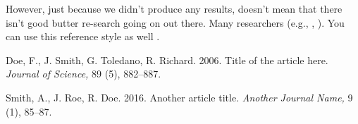 \documentclass[poms,final,nonblindrev]{poms1_V1} %
\begin{document}
However, just because we didn't produce any results, doesn't mean
that there isn't good butter re-search going on out there.  Many
researchers
(e.g., \citealt{Doe2014}, \citealt{Doe2009}). You can use this reference style as well \citep[e.g.][]{Doe2014,Doe2009}.





\begin{thebibliography}{}


    Doe, F., J. Smith, G. Toledano, R. Richard. 2006.
    Title of the article here. {\it Journal of Science,} 89 (5), 882--887.

Smith, A., J. Roe, R. Doe.  2016.
    Another article title. {\it Another Journal Name,} 9 (1), 85--87.

\end{thebibliography}


%
%
%


\end{document}
